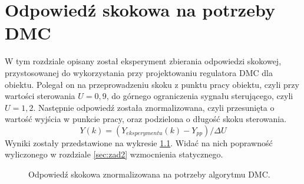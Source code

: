 \chapter{Odpowiedź skokowa na potrzeby DMC}
W tym rozdziale opisany został eksperyment zbierania odpowiedzi skokowej,
przystosowanej do wykorzystania przy projektowaniu regulatora DMC dla obiektu.
Polegał on na przeprowadzeniu skoku z punktu pracy obiektu, czyli przy
wartości sterowania $U = 0,9$, do górnego ograniczenia sygnału sterującego,
czyli $U = 1,2$. Następnie odpowiedź została znormalizowana, czyli przesunięta
o wartość wyjścia w punkcie pracy, oraz podzielona o długość
skoku sterowania.
\begin{equation}
  Y(k) = (Y_{eksperymentu}(k) - Y_{pp})/\Delta U
\end{equation}
Wyniki zostały przedstawione na wykresie \ref{fig:skok_DMC}. Widać na nich
poprawność wyliczonego w rozdziale \ref{sec:zad2} wzmocnienia statycznego.

\begin{figure}[tb]
\centering
{}
\caption{Odpowiedź skokowa znormalizowana na potrzeby algorytmu DMC.}
\label{fig:skok_DMC}
\end{figure}
